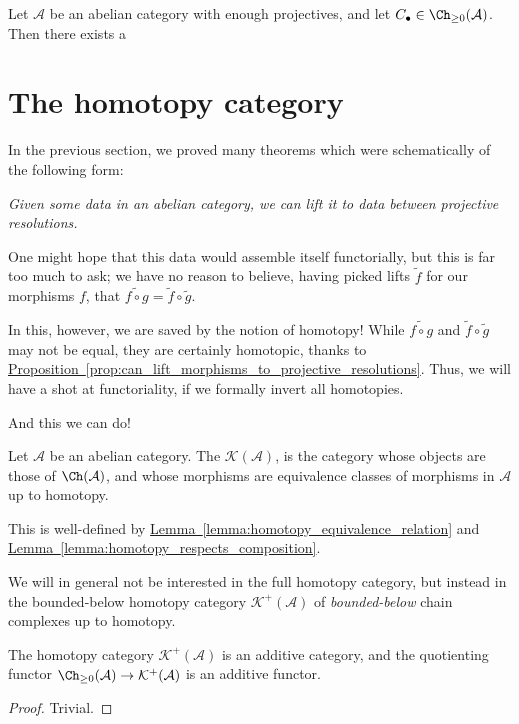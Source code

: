 \documentclass[main.tex]{subfiles}
\begin{document}
\begin{theorem}
  Let $\mathcal{A}$ be an abelian category with enough projectives, and let $C_{\bullet} \in \Ch_{\geq 0}(\mathcal{A})$. Then there exists a 
\end{theorem}

\section{The homotopy category}
\label{sec:the_homotopy_category}

In the previous section, we proved many theorems which were schematically of the following form:

\emph{Given some data in an abelian category, we can lift it to data between projective resolutions.}

One might hope that this data would assemble itself functorially, but this is far too much to ask; we have no reason to believe, having picked lifts $\tilde{f}$ for our morphisms $f$, that $\widetilde{f \circ g} = \tilde{f} \circ \tilde{g}$.

In this, however, we are saved by the notion of homotopy! While $\widetilde{f \circ g}$ and $\tilde{f} \circ \tilde{g}$ may not be equal, they are certainly homotopic, thanks to \hyperref[prop:can_lift_morphisms_to_projective_resolutions]{Proposition~\ref*{prop:can_lift_morphisms_to_projective_resolutions}}. Thus, we will have a shot at functoriality, if we formally invert all homotopies.

And this we can do!

\begin{definition}
  \label{def:homotopy_category}
  Let $\mathcal{A}$ be an abelian category. The  $\mathcal{K}(\mathcal{A})$, is the category whose objects are those of $\Ch(\mathcal{A})$, and whose morphisms are equivalence classes of morphisms in $\mathcal{A}$ up to homotopy.
\end{definition}

This is well-defined by \hyperref[lemma:homotopy_equivalence_relation]{Lemma~\ref*{lemma:homotopy_equivalence_relation}} and \hyperref[lemma:homotopy_respects_composition]{Lemma~\ref*{lemma:homotopy_respects_composition}}.

We will in general not be interested in the full homotopy category, but instead in the bounded-below homotopy category $\mathcal{K}^{+}(\mathcal{A})$ of \emph{bounded-below} chain complexes up to homotopy.


\begin{lemma}
  \label{lemma:homotopy_category_is_additive}
  The homotopy category $\mathcal{K}^{+}(\mathcal{A})$ is an additive category, and the quotienting functor $\Ch_{\geq 0}(\mathcal{A}) \to \mathcal{K}^{+}(\mathcal{A})$ is an additive functor.
\end{lemma}
\begin{proof}
  Trivial.
\end{proof}
\end{document}
